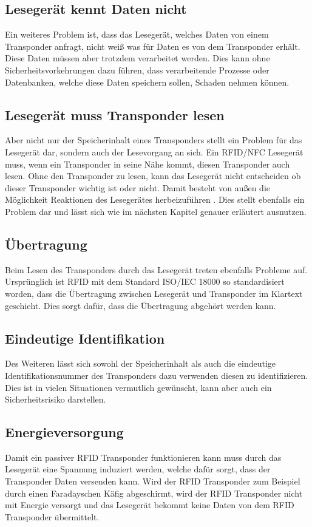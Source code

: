 \documentclass[conference]{IEEEtran}
\begin{document}
\subsection{Lesegerät kennt Daten nicht}
Ein weiteres Problem ist, dass das Lesegerät, welches Daten von einem Transponder anfragt, nicht weiß was für Daten es von dem Transponder erhält. Diese Daten müssen aber trotzdem verarbeitet werden. Dies kann ohne Sicherheitsvorkehrungen dazu führen, dass verarbeitende Prozesse oder Datenbanken, welche diese Daten speichern sollen, Schaden nehmen können.

\subsection{Lesegerät muss Transponder lesen}
Aber nicht nur der Speicherinhalt eines Transponders stellt ein Problem für das Lesegerät dar, sondern auch der Lesevorgang an sich. Ein RFID/NFC Lesegerät muss, wenn ein Transponder in seine Nähe kommt, diesen Transponder auch lesen. Ohne den Transponder zu lesen, kann das Lesegerät nicht entscheiden ob dieser Transponder wichtig ist oder nicht. Damit besteht von außen die Möglichkeit Reaktionen des Lesegerätes herbeizuführen \cite{b3}. Dies stellt ebenfalls ein Problem dar und lässt sich wie im nächsten Kapitel genauer erläutert ausnutzen.

\subsection{Übertragung}
Beim Lesen des Transponders durch das Lesegerät treten ebenfalls Probleme auf. Ursprünglich ist RFID mit dem Standard ISO/IEC 18000 so standardisiert worden, dass die Übertragung zwischen Lesegerät und Transponder im Klartext geschieht. Dies sorgt dafür, dass die Übertragung abgehört werden kann.

\subsection{Eindeutige Identifikation}
Des Weiteren lässt sich sowohl der Speicherinhalt als auch die eindeutige Identifikationsnummer des Transponders dazu verwenden diesen zu identifizieren. Dies ist in vielen Situationen vermutlich gewünscht, kann aber auch ein Sicherheitsrisiko darstellen.

\subsection{Energieversorgung}
Damit ein passiver RFID Transponder funktionieren kann muss durch das Lesegerät eine Spannung induziert werden, welche dafür sorgt, dass der Transponder Daten versenden kann. Wird der RFID Transponder zum Beispiel durch einen Faradayschen Käfig abgeschirmt, wird der RFID Transponder nicht mit Energie versorgt und das Lesegerät bekommt keine Daten von dem RFID Transponder übermittelt.
\end{document}
